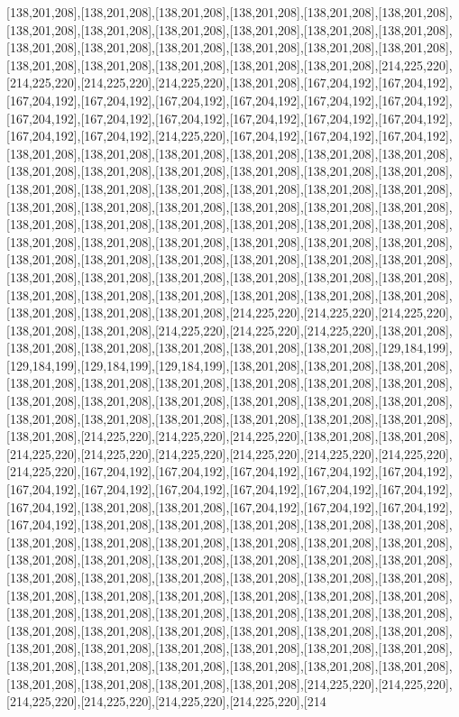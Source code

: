 [138,201,208],[138,201,208],[138,201,208],[138,201,208],[138,201,208],[138,201,208],[138,201,208],[138,201,208],[138,201,208],[138,201,208],[138,201,208],[138,201,208],[138,201,208],[138,201,208],[138,201,208],[138,201,208],[138,201,208],[138,201,208],[138,201,208],[138,201,208],[138,201,208],[138,201,208],[138,201,208],[214,225,220],[214,225,220],[214,225,220],[214,225,220],[138,201,208],[167,204,192],[167,204,192],[167,204,192],[167,204,192],[167,204,192],[167,204,192],[167,204,192],[167,204,192],[167,204,192],[167,204,192],[167,204,192],[167,204,192],[167,204,192],[167,204,192],[167,204,192],[167,204,192],[214,225,220],[167,204,192],[167,204,192],[167,204,192],[138,201,208],[138,201,208],[138,201,208],[138,201,208],[138,201,208],[138,201,208],[138,201,208],[138,201,208],[138,201,208],[138,201,208],[138,201,208],[138,201,208],[138,201,208],[138,201,208],[138,201,208],[138,201,208],[138,201,208],[138,201,208],[138,201,208],[138,201,208],[138,201,208],[138,201,208],[138,201,208],[138,201,208],[138,201,208],[138,201,208],[138,201,208],[138,201,208],[138,201,208],[138,201,208],[138,201,208],[138,201,208],[138,201,208],[138,201,208],[138,201,208],[138,201,208],[138,201,208],[138,201,208],[138,201,208],[138,201,208],[138,201,208],[138,201,208],[138,201,208],[138,201,208],[138,201,208],[138,201,208],[138,201,208],[138,201,208],[138,201,208],[138,201,208],[138,201,208],[138,201,208],[138,201,208],[138,201,208],[138,201,208],[138,201,208],[138,201,208],[214,225,220],[214,225,220],[214,225,220],[138,201,208],[138,201,208],[214,225,220],[214,225,220],[214,225,220],[138,201,208],[138,201,208],[138,201,208],[138,201,208],[138,201,208],[138,201,208],[129,184,199],[129,184,199],[129,184,199],[129,184,199],[138,201,208],[138,201,208],[138,201,208],[138,201,208],[138,201,208],[138,201,208],[138,201,208],[138,201,208],[138,201,208],[138,201,208],[138,201,208],[138,201,208],[138,201,208],[138,201,208],[138,201,208],[138,201,208],[138,201,208],[138,201,208],[138,201,208],[138,201,208],[138,201,208],[138,201,208],[214,225,220],[214,225,220],[214,225,220],[138,201,208],[138,201,208],[214,225,220],[214,225,220],[214,225,220],[214,225,220],[214,225,220],[214,225,220],[214,225,220],[167,204,192],[167,204,192],[167,204,192],[167,204,192],[167,204,192],[167,204,192],[167,204,192],[167,204,192],[167,204,192],[167,204,192],[167,204,192],[167,204,192],[138,201,208],[138,201,208],[167,204,192],[167,204,192],[167,204,192],[167,204,192],[138,201,208],[138,201,208],[138,201,208],[138,201,208],[138,201,208],[138,201,208],[138,201,208],[138,201,208],[138,201,208],[138,201,208],[138,201,208],[138,201,208],[138,201,208],[138,201,208],[138,201,208],[138,201,208],[138,201,208],[138,201,208],[138,201,208],[138,201,208],[138,201,208],[138,201,208],[138,201,208],[138,201,208],[138,201,208],[138,201,208],[138,201,208],[138,201,208],[138,201,208],[138,201,208],[138,201,208],[138,201,208],[138,201,208],[138,201,208],[138,201,208],[138,201,208],[138,201,208],[138,201,208],[138,201,208],[138,201,208],[138,201,208],[138,201,208],[138,201,208],[138,201,208],[138,201,208],[138,201,208],[138,201,208],[138,201,208],[138,201,208],[138,201,208],[138,201,208],[138,201,208],[138,201,208],[138,201,208],[138,201,208],[138,201,208],[138,201,208],[214,225,220],[214,225,220],[214,225,220],[214,225,220],[214,225,220],[214,225,220],[214